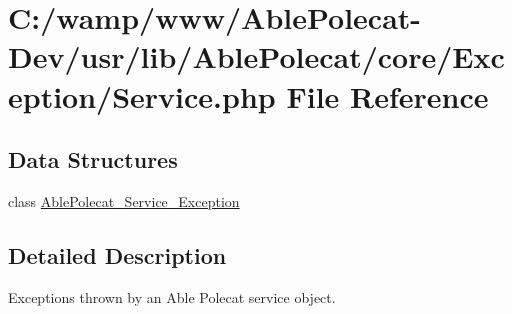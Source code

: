 \hypertarget{_exception_2_service_8php}{}\section{C\+:/wamp/www/\+Able\+Polecat-\/\+Dev/usr/lib/\+Able\+Polecat/core/\+Exception/\+Service.php File Reference}
\label{_exception_2_service_8php}
\subsection*{Data Structures}
\begin{DoxyCompactItemize}
\item 
class \hyperlink{class_able_polecat___service___exception}{Able\+Polecat\+\_\+\+Service\+\_\+\+Exception}
\end{DoxyCompactItemize}


\subsection{Detailed Description}
Exceptions thrown by an Able Polecat service object. 